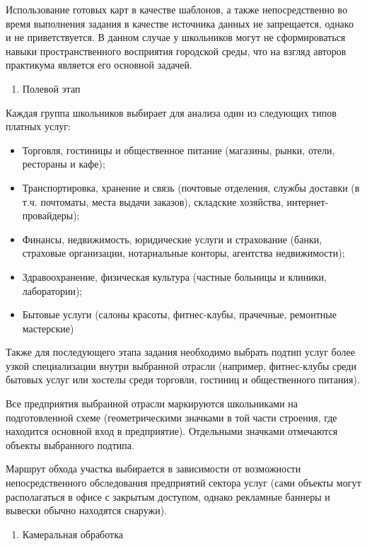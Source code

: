 \documentclass[
  11pt,
]{book}
\providecommand{\tightlist}{%
  \setlength{\itemsep}{0pt}\setlength{\parskip}{0pt}}
\begin{document}
Использование готовых карт в качестве шаблонов, а также непосредственно во время выполнения
задания в качестве источника данных не запрещается, однако и не приветствуется.
В данном случае у школьников могут не сформироваться навыки пространственного
восприятия городской среды, что на взгляд авторов практикума является его
основной задачей.

\begin{enumerate}
\def\labelenumi{\arabic{enumi}.}
\setcounter{enumi}{1}
\tightlist
\item
  Полевой этап
\end{enumerate}

Каждая группа школьников выбирает для анализа один из следующих типов платных услуг:

\begin{itemize}
\item
  Торговля,
  гостиницы и общественное питание (магазины, рынки, отели, рестораны и кафе);
\item
  Транспортировка, хранение и связь
  (почтовые отделения, службы доставки (в т.ч. почтоматы, места выдачи заказов),
  складские хозяйства, интернет-провайдеры);
\item
  Финансы, недвижимость, юридические услуги и страхование (банки, страховые организации,
  нотариальные конторы, агентства недвижимости);
\item
  Здравоохранение, физическая культура (частные больницы и клиники, лаборатории);
\item
  Бытовые услуги (салоны красоты, фитнес-клубы, прачечные, ремонтные мастерские)
\end{itemize}

Также для последующего этапа задания необходимо выбрать подтип услуг более узкой специализации внутри выбранной
отрасли (например, фитнес-клубы среди бытовых услуг или хостелы среди торговли, гостиниц и общественного питания).

Все предприятия выбранной отрасли маркируются школьниками на подготовленной схеме (геометрическими значками в той части строения, где находится основной вход в предприятие). Отдельными значками отмечаются объекты выбранного подтипа.

Маршрут обхода участка выбирается в зависимости от возможности непосредственного обследования предприятий сектора услуг (сами объекты могут располагаться в офисе с закрытым доступом, однако рекламные баннеры и вывески обычно находятся
снаружи).

\begin{enumerate}
\def\labelenumi{\arabic{enumi}.}
\setcounter{enumi}{2}
\tightlist
\item
  Камеральная обработка
\end{enumerate}
\end{document}
